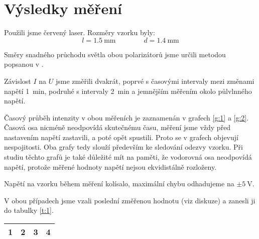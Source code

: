 \section*{Výsledky měření}
Použili jsme červený laser.
Rozměry vzorku byly:
\begin{equation*}
l=\SI{1.5}{\mm} \qquad \qquad d=\SI{1.4}{\mm}
\end{equation*}

Směry snadného průchodu světla obou polarizátorů jsme určili metodou popsanou v \cite{zfp}.

Závislost $I$ na $U$ jsme změřili dvakrát, poprvé s časovými intervaly mezi změnami napětí \SI{1}{\minute}, podruhé s intervaly \SI{2}{\minute} a jemnějším měřením okolo půlvlnného napětí.

Časový průběh intenzity v obou měřeních je zaznamenán v grafech \ref{g:1} a \ref{g:2}. Časová osa nicméně neodpovídá skutečnému času, měření jsme vždy před nastavením napětí zastavili, a poté opět spustili. Proto se v grafech objevují nespojitosti. Oba grafy tedy slouží především ke sledování odezvy vzorku. Při studiu těchto grafů je také důležité mít na paměti, že vodorovná osa neodpovídá napětí, protože měřené hodnoty napětí nejsou ekvidistálně rozloženy.

\begin{graph}[htbp] 
\centering

\caption{První měření (interval \SI{1}{\minute})}
\label{g:1}
\end{graph}

\begin{graph}[htbp] 
\centering

\caption{Druhé měření (interval \SI{2}{\minute})}
\label{g:2}
\end{graph}

Napětí na vzorku během měření kolísalo, maximální chybu odhadujeme na $\pm\SI{5}{\volt}$.

V obou případech jsme vzali poslední změřenou hodnotu (viz diskuze) a zanesli ji do tabulky \ref{t:1}.



\begin{tabulka}[htbp]
\centering
\begin{tabular}{|cccc|}
\hline 
1 & 2 & 3 & 4 \\
\hline
\end{tabular}
\caption{}
\label{t:1}
\end{tabulka}
